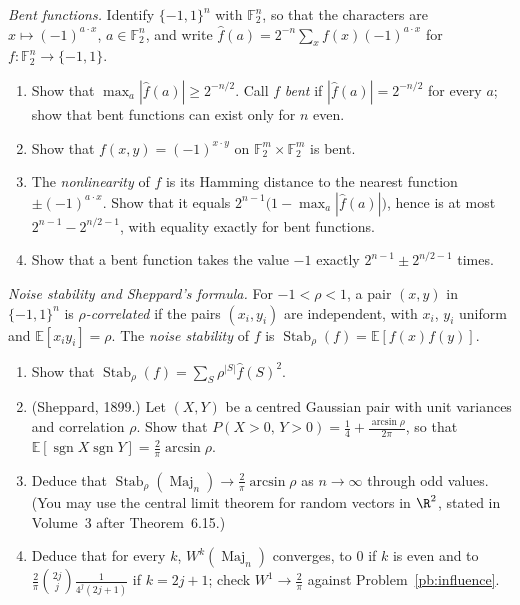 \begin{exercise}[$\star\star$]\label{pb:bent}
\emph{Bent functions.} Identify $\{-1,1\}^n$ with $\mathbb F_2^n$, so that the characters are $x\mapsto(-1)^{a\cdot x}$, $a\in\mathbb F_2^n$, and write
$\hat f(a)=2^{-n}\sum_x f(x)(-1)^{a\cdot x}$ for $f:\mathbb F_2^n\to\{-1,1\}$.
\begin{enumerate}[label=(\alph*)]
\item Show that $\max_a|\hat f(a)|\ge2^{-n/2}$. Call $f$ \emph{bent} if $|\hat f(a)|=2^{-n/2}$ for every $a$; show that bent functions can
exist only for $n$ even.
\item Show that $f(x,y)=(-1)^{x\cdot y}$ on $\mathbb F_2^m\times\mathbb F_2^m$ is bent.
\item The \emph{nonlinearity} of $f$ is its Hamming distance to the nearest function $\pm(-1)^{a\cdot x}$. Show that it equals
$2^{n-1}\bigl(1-\max_a|\hat f(a)|\bigr)$, hence is at most $2^{n-1}-2^{n/2-1}$, with equality exactly for bent functions.
\item Show that a bent function takes the value $-1$ exactly $2^{n-1}\pm2^{n/2-1}$ times.
\end{enumerate}
\end{exercise}

\begin{exercise}[$\star\star\star$]\label{pb:majoritystable}
\emph{Noise stability and Sheppard's formula.} For $-1<\rho<1$, a pair $(x,y)$ in $\{-1,1\}^n$ is \emph{$\rho$-correlated} if the pairs
$(x_i,y_i)$ are independent, with $x_i$, $y_i$ uniform and $\mathbb E[x_iy_i]=\rho$. The \emph{noise stability} of $f$ is
$\operatorname{Stab}_\rho(f)=\mathbb E[f(x)f(y)]$.
\begin{enumerate}[label=(\alph*)]
\item Show that $\operatorname{Stab}_\rho(f)=\sum_S\rho^{|S|}\hat f(S)^2$.
\item (Sheppard, 1899.) Let $(X,Y)$ be a centred Gaussian pair with unit variances and correlation $\rho$. Show that
$P(X>0,\,Y>0)=\frac14+\frac{\arcsin\rho}{2\pi}$, so that $\mathbb E[\operatorname{sgn}X\operatorname{sgn}Y]=\frac2\pi\arcsin\rho$.
\item Deduce that $\operatorname{Stab}_\rho(\operatorname{Maj}_n)\to\frac2\pi\arcsin\rho$ as $n\to\infty$ through odd values. (You may use the central limit theorem for
random vectors in $\R^2$, stated in Volume~3 after Theorem~6.15.)
\item Deduce that for every $k$, $W^k(\operatorname{Maj}_n)$ converges, to $0$ if $k$ is even and to $\frac2\pi\binom{2j}j\frac1{4^j(2j+1)}$ if $k=2j+1$; check
$W^1\to\frac2\pi$ against Problem~\ref{pb:influence}.
\end{enumerate}
\end{exercise}

